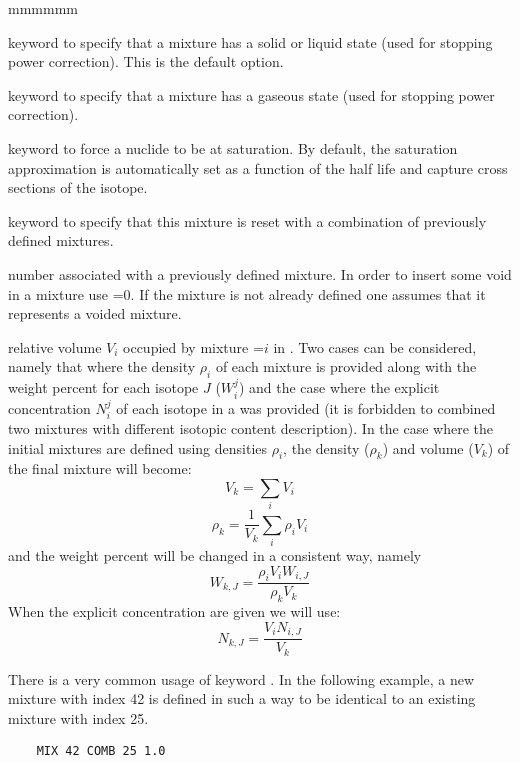 \begin{ListeDeDescription}{mmmmmm}
\item[\moc{NOGAS}] keyword to specify that a mixture has a solid or liquid state (used for stopping power correction).
This is the default option.

\item[\moc{GAS}] keyword to specify that a mixture has a gaseous state (used for stopping power correction).

\item[\moc{SAT}] keyword to force a nuclide to be at saturation. By default, the saturation approximation is
automatically set as a function of the half life and capture cross sections of the isotope.

\item[\moc{COMB}]  keyword to specify that this mixture is reset with a
combination of previously defined mixtures.

\item[\dusa{mati}]  number associated with a previously defined mixture. In
order to insert some void in a mixture use =0. If the mixture is not
already defined one assumes that it represents a voided mixture.

\item[\dusa{relvol}] relative volume $V_{i}$ occupied by mixture
=$i$ in .  Two cases can be considered, namely that
where the density $\rho_{i}$ of each mixture  is provided along with
the weight percent for each isotope $J$ ($W_{i}^{j}$) and the case where the
explicit concentration $N_{i}^{j}$ of each isotope in a  was provided
(it is forbidden to combined two mixtures with different isotopic content
description). In the case where the initial mixtures are defined using densities
$\rho_{i}$, the density ($\rho_k$) and volume ($V_{k}$) of the final mixture
will become:
  $$V_{k}=\sum_{i} V_{i} $$
  $$\rho_{k}=\frac{1}{V_{k}} \sum_{i}\rho_{i}V_{i}$$
and the weight percent will be changed in a consistent way, namely
  $$W_{k,J}=\frac{\rho_{i}V_{i}W_{i,J}}{\rho_{k} V_{k} } $$
When the explicit concentration are given we will use:
  $$N_{k,J}=\frac{V_{i}N_{i,J}}{V_{k} } $$

\vskip 0.08cm

There is a very common usage of keyword . In the following example, a new mixture with index 42
is defined in such a way to be identical to an existing mixture with index 25. 
\begin{verbatim}
    MIX 42 COMB 25 1.0
\end{verbatim}

\end{ListeDeDescription}

